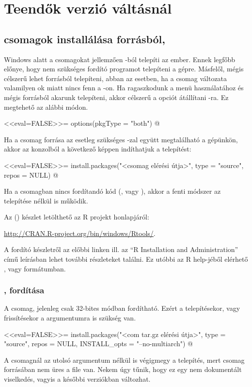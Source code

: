 
\chapter{Teendők  verzió váltásnál}\label{chap:9}

\section{ csomagok installálása forrásból, 
}\label{sec:9.1}

Windows alatt a csomagokat jellemzően -ból telepíti az
ember. Ennek legfőbb előnye, hogy nem szükséges fordító programot
telepíteni a gépre. Másfelől, mégis célszerű lehet forrásból telepíteni, abban az esetben, ha a csomag  változata valamilyen ok miatt nincs fenn
a -on. Ha ragaszkodunk a menü használatához és mégis
forrásból akarunk telepíteni, 
akkor célszerű a  opciót átállítani -ra. Ez
megtehető az alábbi módon. 
\begin{Rnw}
<<eval=FALSE>>=
options(pkgType = "both")
@
\end{Rnw}
Ha a csomag forrása az esetleg szükséges -zal együtt
megtalálható a gépünkön, 
akkor az  konzolból a következő képpen indíthatjuk a telepítést:
\begin{Rnw}
<<eval=FALSE>>=
install.packages("<csomag elérési útja>", type = "source", repos = NULL)
@
\end{Rnw}
Ha a csomagban nincs fordítandó kód (, vagy
), akkor a fenti módszer az 
 telepítése nélkül is működik.

Az  () készlet letölthető az R
projekt honlapjáról: 
\begin{center}
  \url{http://CRAN.R-project.org/bin/windows/Rtools/}.
\end{center}
A fordító készletről az előbbi linken ill. az ``R Installation and
Administration'' című leírásban lehet további részleteket találni. Ez
utóbbi az R help-jéből elérhető , vagy  formátumban.
 

\subsection{,  fordítása}
A  csomag, jelenleg csak 32-bites módban fordítható. Ezért a
telepítésekor, vagy frissítésekor a   argumentumra
is szükség van. 
\begin{Rnw}
<<eval=FALSE>>=
install.packages("<com tar.gz elérési útja>", type = "source", repos = NULL, INSTALL_opts = "--no-multiarch")
@
\end{Rnw}
A  csomagnál az utolsó argumentum nélkül is végigmegy a
telepítés, mert csomag forrásában nem üres a  file
van. Nekem úgy tűnik, hogy ez egy nem dokumentált viselkedés, vagyis a
későbbi verziókban változhat. 

